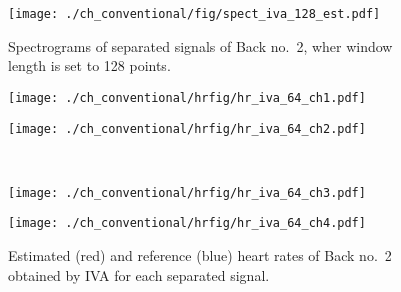 \begin{figure}[tb]
\centering
\texttt{[image: ./ch\_conventional/fig/spect\_iva\_128\_est.pdf]}
\caption{Spectrograms of separated signals of Back no.~2, wher window length is set to 128 points.}
\label{fig:siva128est}
\end{figure}

\begin{figure}[htbp]
     \begin{minipage}[t]{0.45\hsize}
        \centering
        \texttt{[image: ./ch\_conventional/hrfig/hr\_iva\_64\_ch1.pdf]}
        \label{fig:hva32ch1}
      \end{minipage} 
      \begin{minipage}[t]{0.45\hsize}
        \centering
        \texttt{[image: ./ch\_conventional/hrfig/hr\_iva\_64\_ch2.pdf]}
        \label{fig:hva32ch2}
      \end{minipage} \\
      \begin{minipage}[t]{0.45\hsize}
        \centering
        \texttt{[image: ./ch\_conventional/hrfig/hr\_iva\_64\_ch3.pdf]}
        \label{fig:hva32ch3}
      \end{minipage} 
      \begin{minipage}[t]{0.45\hsize}
        \centering
        \texttt{[image: ./ch\_conventional/hrfig/hr\_iva\_64\_ch4.pdf]}
        \label{fig:hva32ch4}
      \end{minipage} 
     \caption{Estimated (red) and reference (blue) heart rates of Back no.~2 obtained by IVA for each separated signal.}
     \label{fig:hriva}
  \end{figure}

